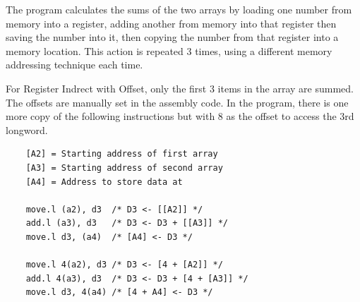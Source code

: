 \documentclass[12pt]{article}
\begin{document}
    The program calculates the sums of the two arrays by loading one number from memory into a register, adding another from memory into that register then saving the number into it, then copying the number from that register into a memory location. This action is repeated 3 times, using a different memory addressing technique each time.
    
    For Register Indrect with Offset, only the first 3 items in the array are summed. The offsets are manually set in the assembly code. In the program, there is one more copy of the following instructions but with 8 as the offset to access the 3rd longword.

    \begin{verbatim}
    [A2] = Starting address of first array
    [A3] = Starting address of second array
    [A4] = Address to store data at
    
    move.l (a2), d3  /* D3 <- [[A2]] */
    add.l (a3), d3   /* D3 <- D3 + [[A3]] */
    move.l d3, (a4)  /* [A4] <- D3 */
    
    move.l 4(a2), d3 /* D3 <- [4 + [A2]] */
    add.l 4(a3), d3  /* D3 <- D3 + [4 + [A3]] */
    move.l d3, 4(a4) /* [4 + A4] <- D3 */
    \end{verbatim}
    
\end{document}
